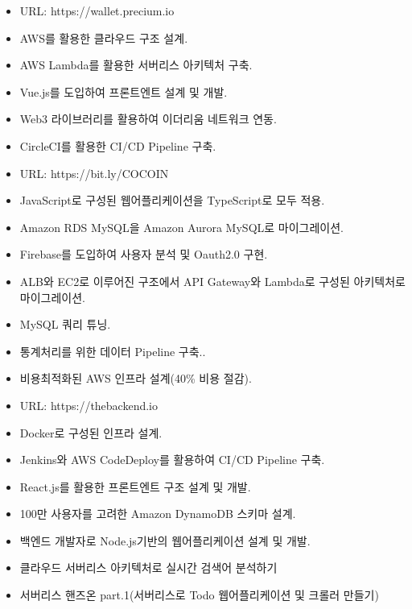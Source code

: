 


    \begin{itemize}
        \item URL: https://wallet.precium.io
        \item AWS를 활용한 클라우드 구조 설계.
        \item AWS Lambda를 활용한 서버리스 아키텍처 구축.
        \item Vue.js를 도입하여 프론트엔트 설계 및 개발.
        \item Web3 라이브러리를 활용하여 이더리움 네트워크 연동.
        \item CircleCI를 활용한 CI/CD Pipeline 구축.
    \end{itemize}
\smallskip
{}
    \begin{itemize}
        \item URL: https://bit.ly/COCOIN
        \item JavaScript로 구성된 웹어플리케이션을 TypeScript로 모두 적용.
        \item Amazon RDS MySQL을 Amazon Aurora MySQL로 마이그레이션.
        \item Firebase를 도입하여 사용자 분석 및 Oauth2.0 구현.
        \item ALB와 EC2로 이루어진 구조에서 API Gateway와 Lambda로 구성된 아키텍처로 마이그레이션.
        \item MySQL 쿼리 튜닝.
        \item 통계처리를 위한 데이터 Pipeline 구축..
        \item 비용최적화된 AWS 인프라 설계(40\% 비용 절감).
    \end{itemize}
\smallskip
{}
    \begin{itemize}
        \item URL: https://thebackend.io
        \item Docker로 구성된 인프라 설계.
        \item Jenkins와 AWS CodeDeploy를 활용하여 CI/CD Pipeline 구축.
        \item React.js를 활용한 프론트엔트 구조 설계 및 개발.
        \item 100만 사용자를 고려한 Amazon DynamoDB 스키마 설계.
        \item 백엔드 개발자로 Node.js기반의 웹어플리케이션 설계 및 개발.
    \end{itemize}
\smallskip


    \begin{itemize}
        \item {클라우드 서버리스 아키텍처로 실시간 검색어 분석하기}
        \item {서버리스 핸즈온 part.1(서버리스로 Todo 웹어플리케이션 및 크롤러 만들기)} 
    \end{itemize}
\smallskip
